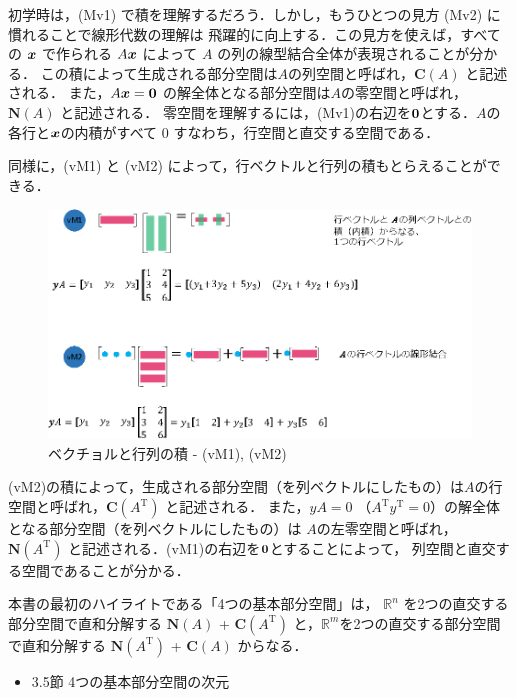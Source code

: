 \documentclass[letterpaper]{article}
\newcommand{\bi}[1]{\hbox{\boldmath$#1$}}
\DeclareRobustCommand\transp{^{\mathrm{T}}}
\begin{document}
初学時は，(Mv1) で積を理解するだろう．しかし，もうひとつの見方 (Mv2) に慣れることで線形代数の理解は
飛躍的に向上する．この見方を使えば，すべての $\bi{x}$ で作られる $A\bi{x}$ によって $A$ の列の線型結合全体が表現されることが分かる．
この積によって生成される部分空間は$A$の列空間と呼ばれ，$\mathbf{C}(A)$ と記述される．
また，$A\bi{x}=\bi{0}$ の解全体となる部分空間は$A$の零空間と呼ばれ，$\mathbf{N}(A)$ と記述される．
零空間を理解するには，(Mv1)の右辺を$\bi{0}$とする．$A$の各行と$\bi{x}$の内積がすべて $0$ すなわち，行空間と直交する空間である．

同様に，(vM1) と (vM2) によって，行ベクトルと行列の積もとらえることができる．

\begin{figure}[H]
  \includegraphics[keepaspectratio, width=\linewidth]{VectorTimesMatrix-j.eps}
  \caption{ベクチョルと行列の積 - (vM1), (vM2)}
\end{figure}

(vM2)の積によって，生成される部分空間（を列ベクトルにしたもの）は$A$の行空間と呼ばれ，$\mathbf{C}(A\transp)$ と記述される．
また，$yA=0$ （$A\transp y\transp=0$）の解全体となる部分空間（を列ベクトルにしたもの）は
$A$の左零空間と呼ばれ，$\mathbf{N}(A\transp)$ と記述される．(vM1)の右辺を$\bi{0}$とすることによって，
列空間と直交する空間であることが分かる．

本書の最初のハイライトである「4つの基本部分空間」は， $\mathbb{R}^n$ を2つの直交する部分空間で直和分解する
$\mathbf{N}(A)$ + $\mathbf{C}(A\transp)$ と，$\mathbb{R}^m$を2つの直交する部分空間で直和分解する
$\mathbf{N}(A\transp)$ + $\mathbf{C}(A)$ からなる．

\begin{itemize}
  \item 3.5節 4つの基本部分空間の次元
\end{itemize} 
\end{document}
